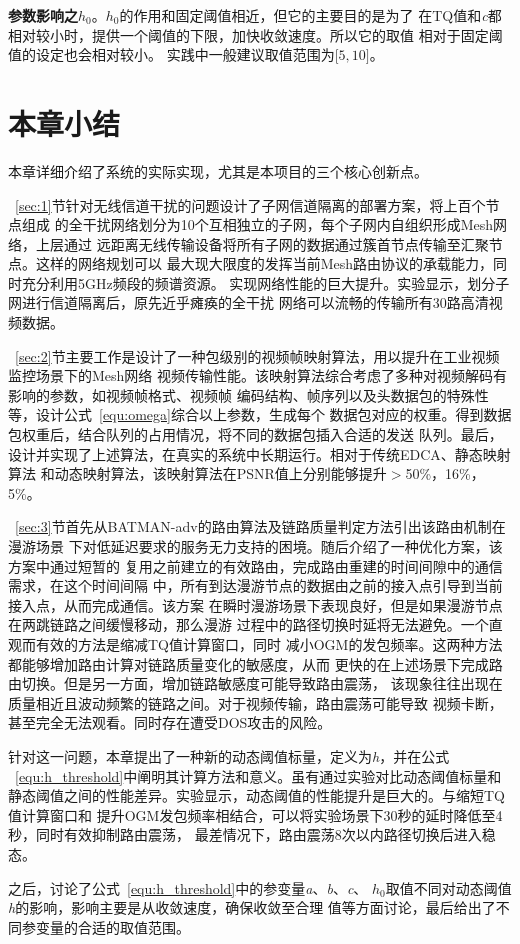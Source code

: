 \textbf{参数影响之$h_{0}$}。$h_{0}$的作用和固定阈值相近，但它的主要目的是为了
在TQ值和\emph{c}都相对较小时，提供一个阈值的下限，加快收敛速度。所以它的取值
相对于固定阈值的设定也会相对较小。
实践中一般建议取值范围为$\lbrack5,10\rbrack$。

\section{本章小结}
本章详细介绍了系统的实际实现，尤其是本项目的三个核心创新点。

~\ref{sec:1}节针对无线信道干扰的问题设计了子网信道隔离的部署方案，将上百个节点组成
的全干扰网络划分为10个互相独立的子网，每个子网内自组织形成Mesh网络，上层通过
远距离无线传输设备将所有子网的数据通过簇首节点传输至汇聚节点。这样的网络规划可以
最大现大限度的发挥当前Mesh路由协议的承载能力，同时充分利用5GHz频段的频谱资源。
实现网络性能的巨大提升。实验显示，划分子网进行信道隔离后，原先近乎瘫痪的全干扰
网络可以流畅的传输所有30路高清视频数据。

~\ref{sec:2}节主要工作是设计了一种包级别的视频帧映射算法，用以提升在工业视频监控场景下的Mesh网络
视频传输性能。该映射算法综合考虑了多种对视频解码有影响的参数，如视频帧格式、视频帧
编码结构、帧序列以及头数据包的特殊性等，设计公式~\ref{equ:omega}综合以上参数，生成每个
数据包对应的权重。得到数据包权重后，结合队列的占用情况，将不同的数据包插入合适的发送
队列。最后，设计并实现了上述算法，在真实的系统中长期运行。相对于传统EDCA、静态映射算法
和动态映射算法，该映射算法在PSNR值上分别能够提升$>$50\%，16\%，5\%。

~\ref{sec:3}节首先从BATMAN-adv的路由算法及链路质量判定方法引出该路由机制在漫游场景
下对低延迟要求的服务无力支持的困境。随后介绍了一种优化方案，该方案中通过短暂的
复用之前建立的有效路由，完成路由重建的时间间隙中的通信需求，在这个时间间隔
中，所有到达漫游节点的数据由之前的接入点引导到当前接入点，从而完成通信。该方案
在瞬时漫游场景下表现良好，但是如果漫游节点在两跳链路之间缓慢移动，那么漫游
过程中的路径切换时延将无法避免。一个直观而有效的方法是缩减TQ值计算窗口，同时
减小OGM的发包频率。这两种方法都能够增加路由计算对链路质量变化的敏感度，从而
更快的在上述场景下完成路由切换。但是另一方面，增加链路敏感度可能导致路由震荡，
该现象往往出现在质量相近且波动频繁的链路之间。对于视频传输，路由震荡可能导致
视频卡断，甚至完全无法观看。同时存在遭受DOS攻击的风险。

针对这一问题，本章提出了一种新的动态阈值标量，定义为\emph{h}，并在公式
~\ref{equ:h_threshold}中阐明其计算方法和意义。虽有通过实验对比动态阈值标量和
静态阈值之间的性能差异。实验显示，动态阈值的性能提升是巨大的。与缩短TQ值计算窗口和
提升OGM发包频率相结合，可以将实验场景下30秒的延时降低至4秒，同时有效抑制路由震荡，
最差情况下，路由震荡8次以内路径切换后进入稳态。

之后，讨论了公式~\ref{equ:h_threshold}中的参变量\emph{a}、\emph{b}、\emph{c}、
$h_{0}$取值不同对动态阈值\emph{h}的影响，影响主要是从收敛速度，确保收敛至合理
值等方面讨论，最后给出了不同参变量的合适的取值范围。


